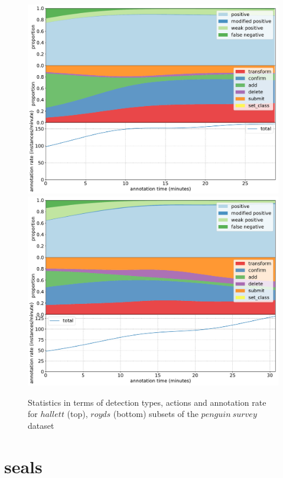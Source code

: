 \pagebreak
\begin{figure}[H]
\begin{minipage}[c][\textheight]{\textwidth}
\centering
\includegraphics[width=1.0\linewidth]{charts/aerial_penguins/action_annotations/hallett_a.pdf}
\includegraphics[width=1.0\linewidth]{charts/aerial_penguins/action_annotations/royds_a.pdf}
\caption{ Statistics in terms of detection types, actions and annotation rate for $hallett$ (top), $royds$ (bottom) subsets of the $penguin\:survey$ dataset }
\label{fig:royds_annotation}
\end{minipage}
\end{figure}


\pagebreak
\section {seals}
\label{sec:seals_details}



